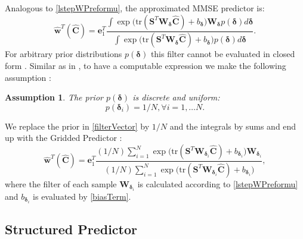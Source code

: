 \documentclass[12pt, draftclsnofoot, onecolumn]{IEEEtran}
\newtheorem{assumption}{Assumption}
\begin{document}
Analogous to \eqref{lstepWPreformu}, the approximated MMSE predictor is: 
\begin{equation}
    \hat{\mathbf{w}}^T(\hat{\mathbf{C}}) 
      =  \mathbf{e}_1^T \dfrac{\int \exp{(\mathrm{tr}( \mathbf{S}^T {\mathbf{W}}_{\boldsymbol{\delta}} \hat{\mathbf{C}})}+b_{\boldsymbol{\delta}}) {\mathbf{W}}_{\boldsymbol{\delta}} p({\boldsymbol{\delta}})  d{\boldsymbol{\delta}} } { \int \exp{(\mathrm{tr}( \mathbf{S}^T {\mathbf{W}}_{\boldsymbol{\delta}} \hat{\mathbf{C}})}+b_{\boldsymbol{\delta}}) p( {\boldsymbol{\delta}}) d{\boldsymbol{\delta}} }.
      \label{filterVector}
\end{equation}
For arbitrary prior distributions $p({\boldsymbol{\delta}})$ this filter cannot be evaluated in closed form \cite{Neumann}. Similar as in \cite{Neumann}, to have a computable expression we make the following assumption \cite{turan2019learning}:\newline
\begin{assumption}
The prior $p({\boldsymbol{\delta}})$ is discrete and uniform: \begin{equation}
    p({\boldsymbol{\delta}_i}) = {1}/{N},  \forall i = 1,\dots N.
\end{equation}
\end{assumption}
We replace the prior in \eqref{filterVector} by ${1}/{N}$ and the integrals by sums and end up with the Gridded Predictor \cite{turan2019learning}:
\begin{equation}
\hat{\mathbf{w}}^T(\hat{\mathbf{C}})  = \mathbf{e}_1^T \dfrac{ ({1}/{N})\sum_{i=1}^{N} \exp{(\mathrm{tr}( \mathbf{S}^T {\mathbf{W}}_{\boldsymbol{\delta}_i} \hat{\mathbf{C}})}+b_{\boldsymbol{\delta}_i}) {\mathbf{W}}_{\boldsymbol{\delta}_i}} { ({1}/{N}) \sum_{i=1}^{N} \exp{(\mathrm{tr}( \mathbf{S}^T {\mathbf{W}}_{\boldsymbol{\delta}_i} \hat{\mathbf{C}})}+b_{\boldsymbol{\delta}_i})},
\label{ass1Filter}
\end{equation}
where the filter of each sample ${\mathbf{W}}_{\boldsymbol{\delta}_i}$ is calculated according to \eqref{lstepWPreformu} and $b_{\boldsymbol{\delta}_i}$ is evaluated by \eqref{biasTerm}.

\subsection{Structured Predictor}
\label{sec:majhead}
\end{document}
